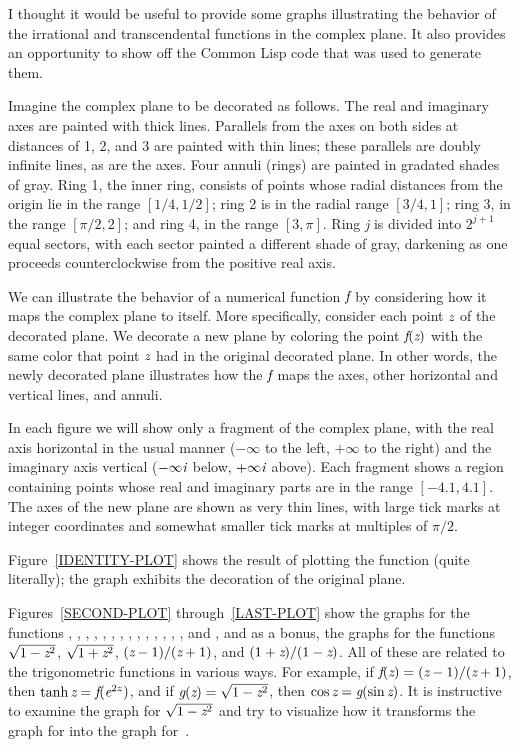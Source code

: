 \begin{new}
I thought it would be useful to provide some graphs illustrating the behavior
of the irrational and transcendental functions in the complex plane.
It also provides an opportunity to show off the Common Lisp code that
was used to generate them.

Imagine the complex plane to be decorated
as follows.  The real and imaginary axes are painted with thick lines.
Parallels from the axes on both sides at distances of 1, 2, and 3 are painted
with thin lines; these parallels are doubly infinite lines, as are the axes.
Four annuli (rings) are painted in gradated shades of gray.  Ring 1, the inner ring,
consists of points whose radial distances from the origin lie in the range
$[1/4,1/2]$; ring 2 is in the radial range
$[3/4, 1]$; ring 3, in the range
$[\pi /2, 2]$; and ring 4, in the range $[3, \pi]$.
Ring \emph{j} is divided into $2^{j+1}$ equal sectors, with each sector
painted a different shade of gray, darkening as one proceeds counterclockwise
from the positive real axis.

We can illustrate the behavior of a numerical function $\emph{f}$ by considering how
it maps the complex plane to itself.  More specifically, consider each
point $\emph{z}$ of the decorated plane.  We decorate a new plane by coloring
the point $\emph{f}(\emph{z})$ with the same color that point $\emph{z}$ had in the original
decorated plane.  In other words, the newly decorated plane illustrates
how the $\emph{f}$ maps the axes, other horizontal and vertical lines, and annuli.

In each figure we will show only a fragment of the complex plane,
with the real axis horizontal in the usual manner ($-\infty$ to the left, $+\infty$
to the right) and the imaginary axis vertical ($-\infty \emph{i}$ below, $+\infty \emph{i}$
above).  Each fragment shows a region containing points whose real and imaginary
parts are in the range $[-4.1, 4.1]$.  The axes of the new plane are shown as very
thin lines, with large tick marks at integer coordinates and somewhat smaller
tick marks at multiples of $\pi/2$.

Figure~\ref{IDENTITY-PLOT} shows the result of plotting the  function
(quite literally); the graph exhibits the decoration of the original plane.

Figures~\ref{SECOND-PLOT} through~\ref{LAST-PLOT} show the graphs for the functions
, , , , , , , , ,
, , , , , and , and
as a bonus, the graphs for the functions $\sqrt{1-\emph{z}^2}$,
$\sqrt{1+\emph{z}^2}$, $(\emph{z}-1)/(\emph{z}+1)$, and $(1+\emph{z})/(1-\emph{z})$.  All of these are related
to the trigonometric functions in various ways.  For example, if
$\emph{f}(\emph{z})=(\emph{z}-1)/(\emph{z}+1)$, then $\tanh \emph{z} = \emph{f}(\emph{e}^{2z})$, and if $\emph{g}(\emph{z})=\sqrt{1-\emph{z}^2}$, then
$\cos \emph{z} = \emph{g}(\sin \emph{z})$.  It is instructive to examine the graph for $\sqrt{1-\emph{z}^2}$
and try to visualize how it transforms the graph for  into the graph for~.


\end{new}
